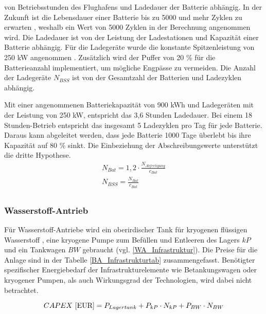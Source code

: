 von Betriebsstunden des Flughafens und Ladedauer der Batterie abhängig. 
In der Zukunft ist die Lebensdauer einer Batterie bis zu 5000 und mehr Zyklen zu erwarten \cite{reimers2018introduction}, 
weshalb ein Wert von 5000 Zyklen in der Berechnung angenommen wird.
Die Ladedauer ist von der Leistung der Ladestationen und Kapazität einer Batterie abhängig.
Für die Ladegeräte wurde die konstante Spitzenleistung von 250 kW angenommen \cite{salucci2020optimal}. 
Zusätzlich wird der Puffer von 20 \% für die Batterieanzahl implementiert, um mögliche Engpässe zu vermeiden. 
Die Anzahl der Ladegeräte $N_{BSS}$ ist von der Gesamtzahl der Batterien und Ladezyklen abhängig.

Mit einer angenommenen Batteriekapazität von 900 kWh und Ladegeräten 
mit der Leistung von 250 kW, entspricht das 3,6 Stunden Ladedauer.
Bei einem 18 Stunden-Betrieb entspricht das insgesamt 5 Ladezyklen pro Tag für jede Batterie. 
Daraus kann abgeleitet werden, dass jede Batterie 1000 Tage überlebt bis ihre Kapazität auf 80 \% sinkt.
Die Einbeziehung der Abschreibungswerte unterstützt die dritte Hypothese.
%
\begin{equation}
   \begin{split}
  {N_{Bat}} = {1,2} \cdot \frac{N_{Abfertigung}}{c_{Bat}}\\
   {N_{BSS}} = \frac{N_{Bat}}{c_{Bat}}\\
   \label{BatInfrAnzahl}
    \end{split}
   \end{equation}
%
\subsubsection{Wasserstoff-Antrieb}
%

Für Wasserstoff-Antriebe wird ein oberirdischer Tank für kryogenen flüssigen Wasserstoff , 
eine kryogene Pumpe zum Befüllen und Entleeren des Lagers ${kP}$ 
und ein Tankwagen ${BW}$ gebraucht (vgl. \eqref{WA_Infrastruktur}). 
Die Preise für die Anlage sind in der Tabelle \ref{BA_Infrastrukturtab} zusammengefasst. 
%
Benötigter spezifischer Energiebedarf der Infrastrukturelemente wie Betankungswagen oder kryogener Pumpen,
als auch Wirkungsgrad der Technologien, wird dabei nicht betrachtet.

\begin{equation}
   {CAPEX ~[\text{EUR}]} = {P_{Lagertank}} + P_{kP} \cdot N_{kP} + P_{BW} \cdot N_{BW}  \\
   \label{WA_Infrastruktur}
\end{equation}

